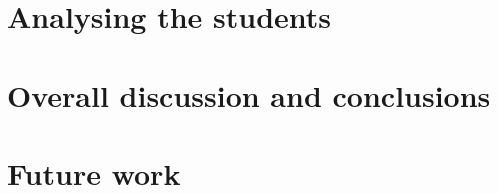 \documentclass[bsc,frontabs,twoside,singlespacing,parskip,deptreport]{infthesis}
\begin{document}
\chapter{Analysing the students}{
}

\chapter{Overall discussion and conclusions}{}

\chapter{Future work}{}


\end{document}
